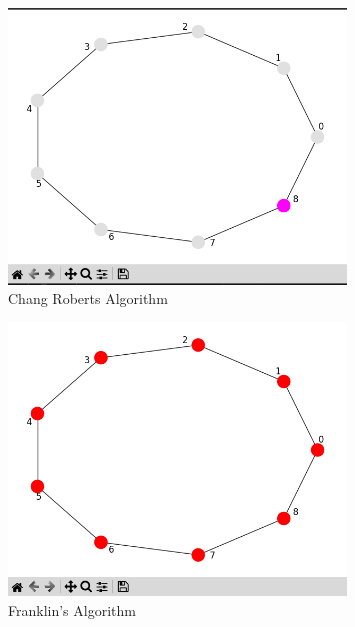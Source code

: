 \documentclass[11pt]{beamer}              %
\begin{document}
\begin{frame}
\begin{figure}
    \centering
    \includegraphics[width=0.8\textwidth]{figures/algo4cr.png}
    \caption{Chang Roberts Algorithm}
\end{figure}
\end{frame}

\begin{frame}
\begin{figure}
    \centering
    \includegraphics[width=0.8\textwidth]{figures/algo1f.png}
    \caption{Franklin's Algorithm}
\end{figure}
\end{frame}
\end{document}
